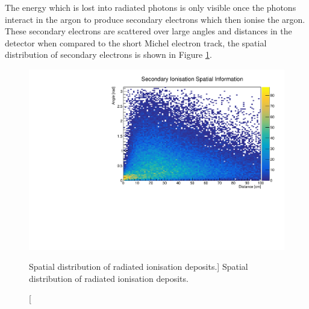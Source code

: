 

The energy which is lost into radiated photons is only visible once the photons
interact in the argon to produce secondary electrons which then ionise the
argon. These secondary electrons are scattered over large angles and distances
in the detector when compared to the short Michel electron track, the spatial 
distribution of secondary electrons is shown in Figure \ref{fig:photon_geom}.
\begin{figure}
	\centering
	\includegraphics[width=\textwidth]{figures/photon_geom.pdf}
	\caption
	[Spatial distribution of radiated ionisation deposits.]
	{Spatial distribution of radiated ionisation deposits.}
	\label{fig:photon_geom}
\end{figure}

